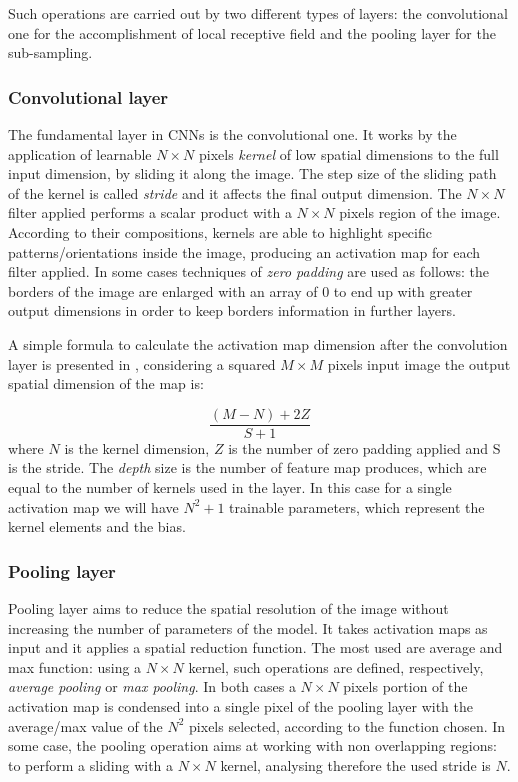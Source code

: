 \documentclass[../main.tex]{subfiles}
\begin{document}
Such operations are carried out by two different types of layers: the convolutional one for the accomplishment of local receptive field and the pooling layer for the sub-sampling.

\subsubsection{Convolutional layer}

The fundamental layer in CNNs is the convolutional one. It works by the application of learnable $N\times N$ pixels \textit{kernel} of low spatial dimensions to the full input dimension, by sliding it along the image.
The step size of the sliding path of the kernel is called \textit{stride} and it affects the final output dimension.
The $N\times N$ filter applied  performs a scalar product with a $N\times N$ pixels region of the image.
According to their compositions, kernels are able to highlight specific patterns/orientations inside the image, producing an activation map for each filter applied. 
In some cases techniques of  \textit{zero padding} are used as follows: the borders of the image are enlarged with an array of $0$ to end up with greater output dimensions in order to keep borders information in further layers.


A simple formula to calculate the activation map dimension after the convolution layer is presented in \cite{o2015introduction-cnn}, considering a squared $M\times M$ pixels input image the output spatial dimension of the map is:

\begin{equation}
    \frac{(M-N)+2Z}{S+1}
\end{equation}
where $N$ is the kernel dimension, $Z$ is the number of zero padding applied and S is the stride. The \textit{depth} size is the number of feature map produces, which are equal to the number of kernels used in the layer. In this case for a single activation map we will have $N^2 + 1$ trainable parameters, which represent the kernel elements and the bias.

\subsubsection{Pooling layer}

Pooling layer aims to reduce the spatial resolution of the image without increasing the number of parameters of the model. 
It takes activation maps as input and it applies a spatial reduction function. 
The most used are average and max function: using a $N\times N$ kernel, such operations are defined, respectively, \textit{average pooling} or \textit{max pooling}.
In both cases a $N\times N$ pixels portion of the activation map is condensed into a single pixel of the pooling layer with the average/max value of the $N^2$ pixels selected, according to the function chosen.
In some case, the pooling operation aims at working with non overlapping regions: to perform a sliding with a $N\times N$ kernel, analysing therefore the used stride is $N$.
\end{document}
